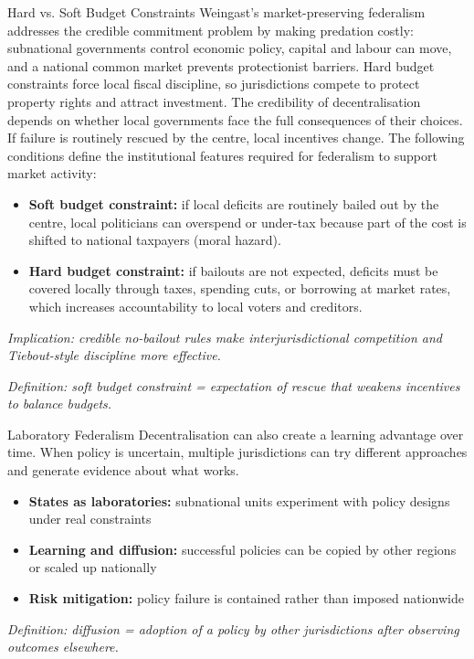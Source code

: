\documentclass[10pt]{beamer}
\begin{document}
\begin{frame}[allowframebreaks]{Hard vs. Soft Budget Constraints}
Weingast’s market-preserving federalism addresses the credible commitment problem by making predation costly: subnational governments control economic policy, capital and labour can move, and a national common market prevents protectionist barriers. Hard budget constraints force local fiscal discipline, so jurisdictions compete to protect property rights and attract investment.
The credibility of decentralisation depends on whether local governments face the full consequences of their choices.
If failure is routinely rescued by the centre, local incentives change. The following conditions define the institutional features required for federalism to support market activity:

\begin{itemize}
\item \textbf{Soft budget constraint:} if local deficits are routinely bailed out by the centre, local politicians can overspend or under-tax because part of the cost is shifted to national taxpayers (moral hazard).
\item \textbf{Hard budget constraint:} if bailouts are not expected, deficits must be covered locally through taxes, spending cuts, or borrowing at market rates, which increases accountability to local voters and creditors.
\end{itemize}

\vspace{0.1cm}
\footnotesize
\textit{Implication: credible no-bailout rules make interjurisdictional competition and Tiebout-style discipline more effective.}


\vspace{0.1cm}
\footnotesize
\textit{Definition: soft budget constraint = expectation of rescue that weakens incentives to balance budgets.}
\end{frame}

\begin{frame}{Laboratory Federalism}
Decentralisation can also create a learning advantage over time.
When policy is uncertain, multiple jurisdictions can try different approaches and generate evidence about what works.

\begin{itemize}
\item \textbf{States as laboratories:} subnational units experiment with policy designs under real constraints
\item \textbf{Learning and diffusion:} successful policies can be copied by other regions or scaled up nationally
\item \textbf{Risk mitigation:} policy failure is contained rather than imposed nationwide
\end{itemize}

\vspace{0.1cm}
\footnotesize
\textit{Definition: diffusion = adoption of a policy by other jurisdictions after observing outcomes elsewhere.}
\end{frame}
\end{document}
